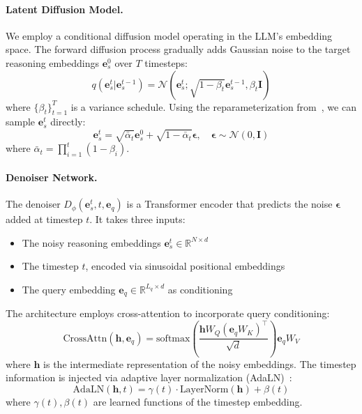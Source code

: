 \documentclass{article}
\newcommand{\mcN}{\mathcal{N}}
\newcommand{\be}{\mathbf{e}}
\newcommand{\bh}{\mathbf{h}}
\begin{document}
\paragraph{Latent Diffusion Model.}
We employ a conditional diffusion model operating in the LLM's embedding space. The forward diffusion process gradually adds Gaussian noise to the target reasoning embeddings $\be_s^0$ over $T$ timesteps:
\begin{equation}
    q(\be_s^t | \be_s^{t-1}) = \mcN(\be_s^t; \sqrt{1-\beta_t}\be_s^{t-1}, \beta_t \mathbf{I})
\end{equation}
where $\{\beta_t\}_{t=1}^T$ is a variance schedule. Using the reparameterization from~\citep{ho2020denoising}, we can sample $\be_s^t$ directly:
\begin{equation}
    \be_s^t = \sqrt{\bar{\alpha}_t}\be_s^0 + \sqrt{1-\bar{\alpha}_t}\bm{\epsilon}, \quad \bm{\epsilon} \sim \mcN(0, \mathbf{I})
\end{equation}
where $\bar{\alpha}_t = \prod_{i=1}^t (1-\beta_i)$.

\paragraph{Denoiser Network.}
The denoiser $D_\phi(\be_s^t, t, \be_q)$ is a Transformer encoder that predicts the noise $\bm{\epsilon}$ added at timestep $t$. It takes three inputs:
\begin{itemize}
    \item The noisy reasoning embeddings $\be_s^t \in \mathbb{R}^{N \times d}$
    \item The timestep $t$, encoded via sinusoidal positional embeddings
    \item The query embedding $\be_q \in \mathbb{R}^{L_q \times d}$ as conditioning
\end{itemize}

The architecture employs cross-attention to incorporate query conditioning:
\begin{equation}
    \text{CrossAttn}(\bh, \be_q) = \text{softmax}\left(\frac{\bh W_Q (\be_q W_K)^\top}{\sqrt{d}}\right) \be_q W_V
\end{equation}
where $\bh$ is the intermediate representation of the noisy embeddings. The timestep information is injected via adaptive layer normalization (AdaLN)~\citep{peebles2023scalable}:
\begin{equation}
    \text{AdaLN}(\bh, t) = \gamma(t) \cdot \text{LayerNorm}(\bh) + \beta(t)
\end{equation}
where $\gamma(t), \beta(t)$ are learned functions of the timestep embedding.
\end{document}
